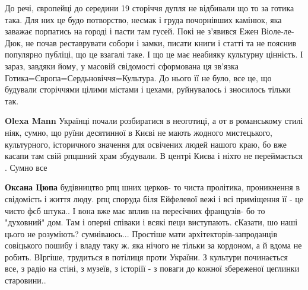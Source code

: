 \begin{itemize}
До речі, європейці до середини 19 сторіччя дупля не відбивали що то за готика
така. Для них це будо потворство, несмак і груда почорнівших камінюк, яка
заважає порпатись на городі і пасти там гусей. Покі не з’явився Ежен
Віоле-ле-Дюк, не почав реставрувати собори і замки, писати книги і статті та не
пояснив популярно публіці, що це взагалі таке. І що це має неабияку культурну
цінність. І зараз, завдяки йому, у масовій свідомості сформована ця зв’язка
Готика=Європа=Сердьновіччя=Культура. До нього її не було, все це, що будували
сторіччями цілими містами і цехами, руйнувалось і зносилось тільки так.

\begin{itemize} %
 
\textbf{Olexa Mann} Українці почали розбиратися в неоготиці, а от в романському стилі ніяк, сумно, що руїни десятинної в Києві не мають жодного мистецького, культурного, історичного значення для освічених людей нашого краю, бо вже касапи там свій рпцшний храм збудували. В центрі Києва і ніхто не переймається . Сумно все

 
\textbf{Оксана Цюпа} будівництво рпц шних церков- то чиста пролітика, проникнення в свідомість і життя люду. рпц споруда біля Ейфелевої вежі і всі приміщення її - це чисто фсб штука.. І вона вже має вплив на пересічних французів- бо то "духовний" дом. Там і оперні співаки і всякі пеци виступають. сКазати, шо наші цього не розуміють? сумніваюсь... Простіше мати архітекторів-запроданців совіцького пошибу і владу таку ж. яка нічого не тільки за кордоном, а й вдома не робить. ВІргіше, трудиться в потілиця проти України. З культури починається все, з радіо на стіні, з музеїв, з історіїї - з поваги до кожної збереженої цеглинки старовини..

 

\end{itemize}
\end{itemize}

